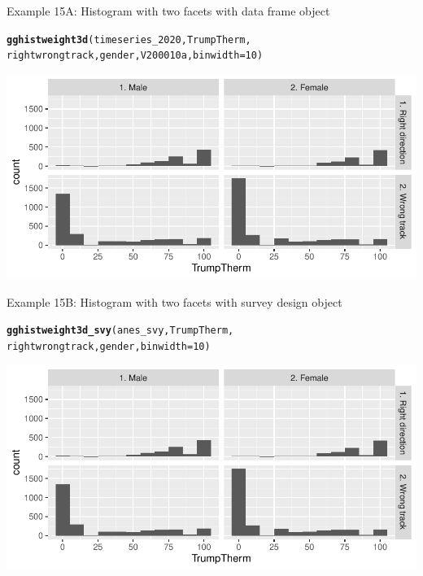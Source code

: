 \documentclass{beamer}\usepackage[]{graphicx}\usepackage[]{color}
\makeatletter
\newcommand{\hlnum}[1]{\textcolor[rgb]{0.686,0.059,0.569}{#1}}%
\newcommand{\hlstd}[1]{\textcolor[rgb]{0.345,0.345,0.345}{#1}}%
\newcommand{\hlkwc}[1]{\textcolor[rgb]{0.333,0.667,0.333}{#1}}%
\newcommand{\hlkwd}[1]{\textcolor[rgb]{0.737,0.353,0.396}{\textbf{#1}}}%
\newenvironment{kframe}{%
 \def\at@end@of@kframe{}%
 \ifinner\ifhmode%
  \def\at@end@of@kframe{\end{minipage}}%
  \begin{minipage}{\columnwidth}%
 \fi\fi%
 \def\FrameCommand##1{\hskip\@totalleftmargin \hskip-\fboxsep
 \colorbox{shadecolor}{##1}\hskip-\fboxsep
     \hskip-\linewidth \hskip-\@totalleftmargin \hskip\columnwidth}%
 \MakeFramed {\advance\hsize-\width
   \@totalleftmargin\z@ \linewidth\hsize
   \@setminipage}}%
 {\par\unskip\endMakeFramed%
 \at@end@of@kframe}
\newenvironment{knitrout}{}{} %
\makeatother
\begin{document}
\begin{frame}[fragile]{Example 15A: Histogram with two facets with data frame object}
\begin{knitrout}
\color{fgcolor}\begin{kframe}
\begin{alltt}
\hlkwd{gghistweight3d}\hlstd{(timeseries_2020, TrumpTherm,}
    \hlstd{rightwrongtrack, gender, V200010a,} \hlkwc{binwidth} \hlstd{=} \hlnum{10}\hlstd{)}
\end{alltt}
\end{kframe}
\includegraphics[width=0.95\linewidth]{figure/unnamed-chunk-58-1} 
\end{knitrout}

\end{frame}

\begin{frame}[fragile]{Example 15B: Histogram with two facets with survey design object}
\begin{knitrout}
\color{fgcolor}\begin{kframe}
\begin{alltt}
\hlkwd{gghistweight3d_svy}\hlstd{(anes_svy, TrumpTherm,}
    \hlstd{rightwrongtrack, gender,} \hlkwc{binwidth} \hlstd{=} \hlnum{10}\hlstd{)}
\end{alltt}
\end{kframe}
\includegraphics[width=0.95\linewidth]{figure/unnamed-chunk-59-1} 
\end{knitrout}

\end{frame}
\end{document}
